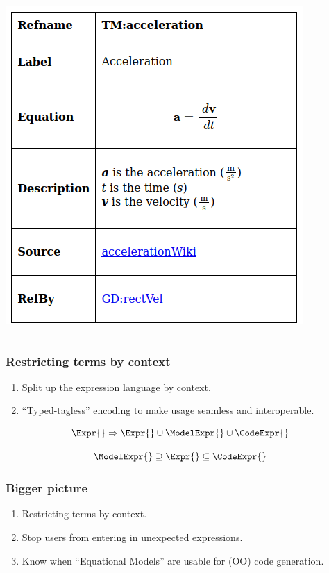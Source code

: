 \documentclass[xcolor={dvipsnames}]{beamer}
\begin{document}
\begin{frame}[fragile]
\begin{columns}
\begin{column}{0.3\textwidth}
\begin{center}
        \vspace{1em}

        \includegraphics[width=\textwidth]{abstractTheory.png}
      \end{center}
    \end{column}
  \end{columns}
\end{frame}

\begin{frame}
  \frametitle{Restricting terms by context}

  \begin{enumerate}
    \item Split up the expression language by context.
    \item ``Typed-tagless'' encoding to make usage seamless and interoperable.
  \end{enumerate}

  \[\Expr{} \Rightarrow{} \Expr{} \cup{} \ModelExpr{} \cup{} \CodeExpr{}\]

  \[\ModelExpr{} \supseteq \Expr{} \subseteq \CodeExpr{}\]

\end{frame}

\begin{frame}
  \frametitle{Bigger picture}

  \begin{enumerate}
    \item Restricting terms by context.
    \item Stop users from entering in unexpected expressions.
    \item Know when ``Equational Models'' are usable for (OO) code generation.
  \end{enumerate}

\end{frame}
\end{document}

